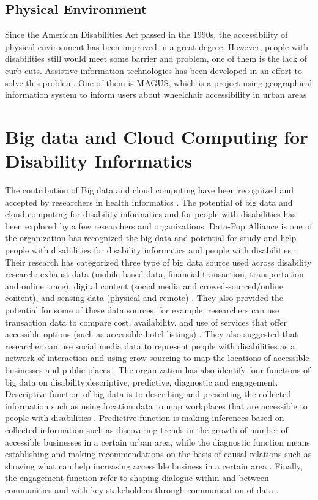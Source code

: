 \documentclass[sigconf]{acmart}
\begin{document}
\subsection{Physical Environment}
Since the American Disabilities Act passed in the 1990s, the accessibility of physical environment has been
improved in a great degree. However, people with disabilities still would meet some barrier and problem, 
one of them is the lack of curb cuts. Assistive information technologies has been developed in an effort to
solve this problem. One of them is MAGUS, which is a project using geographical information system to inform 
users about wheelchair accessibility in urban areas \cite{Appleyard2005}



\section{Big data and Cloud Computing for Disability Informatics}
The contribution of Big data and cloud computing have been recognized and accepted by researchers in health informatics \cite{7047725}. The potential of big data and cloud computing for disability informatics and for people with disabilities has 
been explored by a few researchers and organizations. Data-Pop Alliance is one of the organization has recognized 
the big data and potential for study and help people with disabilities for disability informatics and people 
with disabilities \cite{Datapop}. Their research has categorized three type of big data source used across disability
research: exhaust data (mobile-based data, financial transaction, transportation and online trace), digital 
content (social media and crowed-sourced/online content), and sensing data (physical and remote) \cite{Datapop}. 
They also provided the potential for some of these data sources, for example, researchers can use transaction 
data to compare cost, availability, and use of services that offer accessible options (such as accessible hotel 
listings) \cite{Datapop}. They also suggested that researcher can use social media data to represent people with
disabilities as a network of interaction and using crow-sourcing to map the locations of accessible businesses 
and public places \cite{Datapop}. 
The organization has also identify four functions of big data on disability:descriptive, predictive, diagnostic 
and engagement. Descriptive function of big data is to describing and presenting the collected information such
as using location data to map workplaces that are accessible to people with disabilities \cite{Datapop}. 
Predictive function is making inferences based on collected information such as discovering trends in the 
growth of number of accessible businesses in a certain urban area, while the diagnostic function means
establishing and making recommendations on the basis of causal relations such as showing what can help 
increasing accessible business in a certain area \cite{Datapop}. Finally, the engagement function refer
to shaping dialogue within and between communities and with key stakeholders through communication of data \cite{Datapop}.
\end{document}
